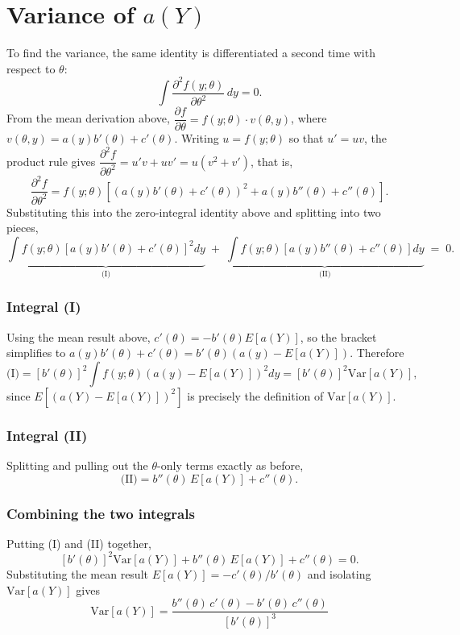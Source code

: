 \documentclass[12pt,a4paper]{report}
\begin{document}
\section{Variance of $a(Y)$}

To find the variance, the same identity is differentiated a second time with respect to $\theta$:
\[
\int \frac{\partial^2 f(y;\theta)}{\partial \theta^2}\, dy = 0.
\]
From the mean derivation above, $\dfrac{\partial f}{\partial \theta} = f(y;\theta)\cdot v(\theta,y)$, where $v(\theta,y) = a(y)b'(\theta) + c'(\theta)$. Writing $u = f(y;\theta)$ so that $u' = uv$, the product rule gives $\dfrac{\partial^2 f}{\partial\theta^2} = u'v + uv' = u(v^2 + v')$, that is,
\[
\frac{\partial^2 f}{\partial \theta^2} = f(y;\theta)\left[\left(a(y)b'(\theta)+c'(\theta)\right)^2 + a(y)b''(\theta) + c''(\theta)\right].
\]
Substituting this into the zero-integral identity above and splitting into two pieces,
\[
\underbrace{\int f(y;\theta)\left[a(y)b'(\theta)+c'(\theta)\right]^2 dy}_{\text{(I)}}
\;+\;
\underbrace{\int f(y;\theta)\left[a(y)b''(\theta)+c''(\theta)\right] dy}_{\text{(II)}}
\;=\; 0.
\]

\subsubsection*{Integral (I)}

Using the mean result above, $c'(\theta) = -b'(\theta)E[a(Y)]$, so the bracket simplifies to $a(y)b'(\theta) + c'(\theta) = b'(\theta)\left(a(y) - E[a(Y)]\right)$. Therefore
\[
\text{(I)} = \left[b'(\theta)\right]^2 \int f(y;\theta)\left(a(y)-E[a(Y)]\right)^2 dy = \left[b'(\theta)\right]^2 \text{Var}[a(Y)],
\]
since $E\left[(a(Y)-E[a(Y)])^2\right]$ is precisely the definition of $\text{Var}[a(Y)]$.

\subsubsection*{Integral (II)}

Splitting and pulling out the $\theta$-only terms exactly as before,
\[
\text{(II)} = b''(\theta)\, E[a(Y)] + c''(\theta).
\]

\subsubsection*{Combining the two integrals}

Putting (I) and (II) together,
\[
\left[b'(\theta)\right]^2 \text{Var}[a(Y)] + b''(\theta)\, E[a(Y)] + c''(\theta) = 0.
\]
Substituting the mean result $E[a(Y)] = -c'(\theta)/b'(\theta)$ and isolating $\text{Var}[a(Y)]$ gives
\[
\boxed{\text{Var}[a(Y)] = \frac{b''(\theta)\,c'(\theta) - b'(\theta)\,c''(\theta)}{\left[b'(\theta)\right]^{3}}}
\]
\end{document}
